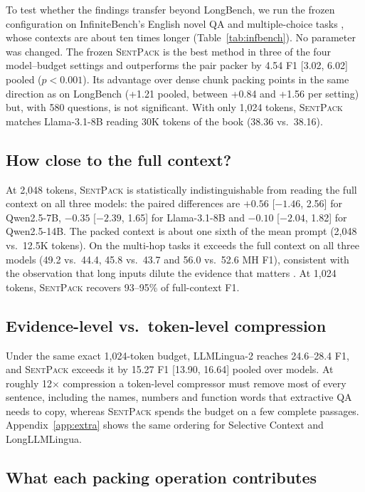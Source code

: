 \documentclass[11pt]{article}
\newcommand{\spk}{\textsc{SentPack}}
\begin{document}
To test whether the findings transfer beyond LongBench, we run the frozen configuration on InfiniteBench's English novel QA and multiple-choice tasks \citep{zhang2024infinitebench}, whose contexts are about ten times longer (Table~\ref{tab:infbench}). No parameter was changed. The frozen \spk{} is the best method in three of the four model--budget settings and outperforms the pair packer by 4.54 F1 [3.02, 6.02] pooled ($p<0.001$). Its advantage over dense chunk packing points in the same direction as on LongBench (+1.21 pooled, between +0.84 and +1.56 per setting) but, with 580 questions, is not significant. With only 1,024 tokens, \spk{} matches Llama-3.1-8B reading 30K tokens of the book (38.36 vs.\ 38.16).

\subsection{How close to the full context?}
At 2,048 tokens, \spk{} is statistically indistinguishable from reading the full context on all three models: the paired differences are $+0.56$ [$-1.46$, 2.56] for Qwen2.5-7B, $-0.35$ [$-2.39$, 1.65] for Llama-3.1-8B and $-0.10$ [$-2.04$, 1.82] for Qwen2.5-14B. The packed context is about one sixth of the mean prompt (2,048 vs.\ 12.5K tokens). On the multi-hop tasks it exceeds the full context on all three models (49.2 vs.\ 44.4, 45.8 vs.\ 43.7 and 56.0 vs.\ 52.6 MH F1), consistent with the observation that long inputs dilute the evidence that matters \citep{liu2024lost}. At 1,024 tokens, \spk{} recovers 93--95\% of full-context F1.

\subsection{Evidence-level vs.\ token-level compression}
Under the same exact 1,024-token budget, LLMLingua-2 reaches 24.6--28.4 F1, and \spk{} exceeds it by 15.27 F1 [13.90, 16.64] pooled over models. At roughly 12$\times$ compression a token-level compressor must remove most of every sentence, including the names, numbers and function words that extractive QA needs to copy, whereas \spk{} spends the budget on a few complete passages. Appendix~\ref{app:extra} shows the same ordering for Selective Context and LongLLMLingua.

\subsection{What each packing operation contributes}
\label{sec:components}
\end{document}

